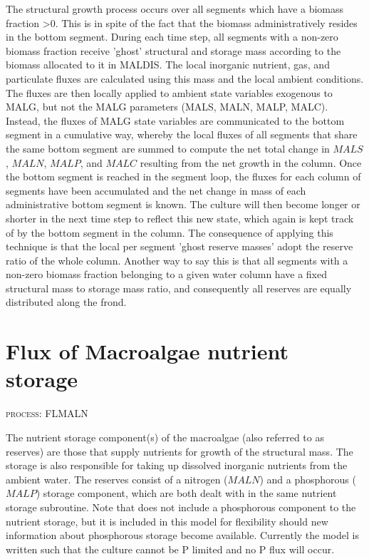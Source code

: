 \documentclass{deltares_manual}
\begin{document}
The structural growth process occurs over all segments which have a biomass fraction \textgreater 0. This is in spite of the fact that the biomass administratively resides in the bottom segment. During each time step, all segments with a non-zero biomass fraction receive 'ghost' structural and storage mass according to the biomass allocated to it in MALDIS. The local inorganic nutrient, gas, and particulate fluxes are calculated using this mass and the local ambient conditions. The fluxes are then locally applied to ambient state variables exogenous to MALG, but not the MALG parameters (MALS, MALN, MALP, MALC). Instead, the fluxes of MALG state variables are communicated to the bottom segment in a cumulative way, whereby the local fluxes of all segments that share the same bottom segment are summed to compute the net total change in $MALS$, $MALN$, $MALP$, and $MALC$ resulting from the net growth in the column. Once the bottom segment is reached in the segment loop, the fluxes for each column of segments have been accumulated and the net change in mass of each administrative bottom segment is known. The culture will then become longer or shorter in the next time step to reflect this new state, which again is kept track of by the bottom segment in the column. The consequence of applying this technique is that the local per segment 'ghost reserve masses' adopt the reserve ratio of the whole column. Another way to say this is that all segments with a non-zero biomass fraction belonging to a given water column have a fixed structural mass to storage mass ratio, and consequently all reserves are equally distributed along the frond.
\pagebreak

\section{Flux of Macroalgae nutrient storage}
\begin{flushright}
\textsc{process: FLMALN}
\end{flushright}

The nutrient storage component(s) of the macroalgae (also referred to as reserves) are those that supply nutrients for growth of the structural mass. The storage is also responsible for taking up dissolved inorganic nutrients from the ambient water. The reserves consist of a nitrogen ($MALN$) and a phosphorous ($MALP$) storage component, which are both dealt with in the same nutrient storage subroutine. Note that \cite{broch2012} does not include a phosphorous component to the nutrient storage, but it is included in this model for flexibility should new information about phosphorous storage become available. Currently the model is written such that the culture cannot be P limited and no P flux will occur.
\end{document}

